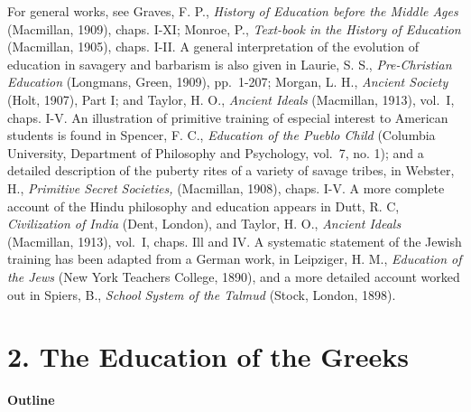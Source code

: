 \documentclass[]{book}
\begin{document}
For general works, see Graves, F. P., \emph{History of Education before the Middle Ages} (Macmillan, 1909), chaps. I-XI; Monroe, P., \emph{Text-book in the History of Education} (Macmillan, 1905), chaps. I-II. A general interpretation of the evolution of education in savagery and barbarism is also given in Laurie, S. S., \emph{Pre-Christian Education} (Longmans, Green, 1909), pp.~1-207; Morgan, L. H., \emph{Ancient Society} (Holt, 1907), Part I; and Taylor, H. O., \emph{Ancient Ideals} (Macmillan, 1913), vol.~I, chaps. I-V. An illustration of primitive training of especial interest to American students is found in Spencer, F. C., \emph{Education of the Pueblo Child} (Columbia University, Department of Philosophy and Psychology, vol.~7, no. 1); and a detailed description of the puberty rites of a variety of savage tribes, in Webster, H., \emph{Primitive Secret Societies,} (Macmillan, 1908), chaps. I-V. A more complete account of the Hindu philosophy and education appears in Dutt, R. C, \emph{Civilization of India} (Dent, London), and Taylor, H. O., \emph{Ancient Ideals} (Macmillan, 1913), vol.~I, chaps. Ill and IV. A systematic statement of the Jewish training has been adapted from a German work, in Leipziger, H. M., \emph{Education of the Jews} (New York Teachers College, 1890), and a more detailed account worked out in Spiers, B., \emph{School System of the Talmud} (Stock, London, 1898).

\hypertarget{the-education-of-the-greeks}{%
\chapter{2. The Education of the Greeks}\label{the-education-of-the-greeks}}

\textbf{Outline}
\end{document}
